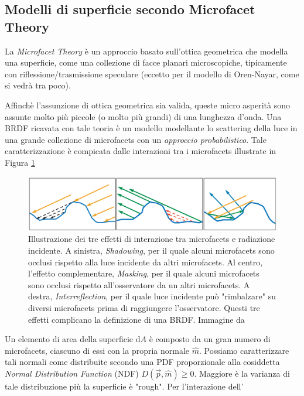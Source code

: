 \subsection{Modelli di superficie secondo Microfacet Theory}
La \textit{Microfacet Theory} \`e un approccio basato sull'ottica geometrica che modella una superficie, come una collezione di facce planari
microscopiche, tipicamente con riflessione/trasmissione speculare (eccetto per il modello di Oren-Nayar, come si vedr\`a tra poco).\par
Affinch\`e l'assunzione di ottica geometrica sia valida, queste micro asperit\`a sono assunte molto pi\`u piccole (o molto pi\`u grandi) di una 
lunghezza d'onda. Una BRDF ricavata con tale teoria \`e un modello modellante lo scattering della luce in una grande collezione di microfacets con 
un \textit{approccio probabilistico}. Tale caratterizzazione \`e compicata dalle interazioni tra i microfacets illustrate in Figura 
\ref{chapter3:surface:microgeometryEffects}\par
\begin{figure}[tb]
	\centering
	\includegraphics[width=\linewidth]{../assets/chapter3_surface_microgeometry_effectsAM.png}
	\caption{Illustrazione dei tre effetti di interazione tra microfacets e radiazione incidente. A sinistra, \textit{Shadowing}, per il quale 
		alcuni microfacets sono occlusi rispetto alla luce incidente da altri microfacets. Al centro, l'effetto complementare, \textit{Masking},
		per il quale alcuni microfacets sono occlusi rispetto all'osservatore da un altri microfacets. A destra, \textit{Interreflection}, per il
		quale luce incidente pu\`o "rimbalzare" su diversi microfacets prima di raggiungere l'osservatore. Questi tre effetti complicano la 
		definizione di una BRDF. Immagine da \cite{akenine-moller}}
	\label{chapter3:surface:microgeometryEffects}
\end{figure}
Un elemento di area della superficie $\mathrm{d}A$ \`e composto da un gran numero di microfacets, ciascuno di essi con la propria normale $\hat{m}$.
Possiamo caratterizzare tali normali come distribuite secondo una PDF proporzionale alla cosiddetta \textit{Normal Distribution Function} (NDF) 
$D(\vec{p},\hat{m})\geq0$. Maggiore \`e la varianza di tale distribuzione pi\`u la superficie \`e "rough". Per l'interazione dell'
